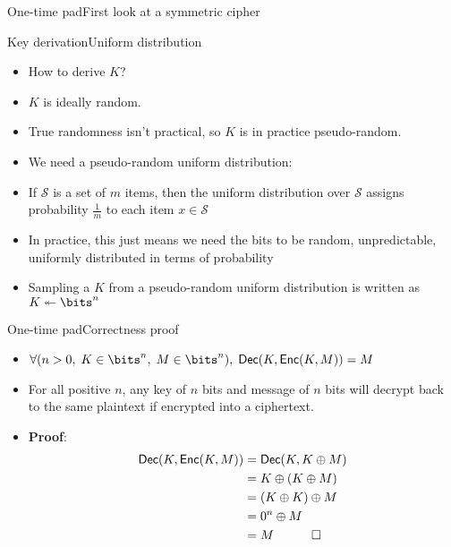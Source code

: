\documentclass[aspectratio=169, lualatex, handout]{beamer}
\begin{document}
\begin{frame}{One-time pad}{First look at a symmetric cipher}
\end{frame}

\begin{frame}{Key derivation}{Uniform distribution}
	\begin{itemize}[<+->]
		\item How to derive $K$?
		\item $K$ is ideally random.
		\item True randomness isn't practical, so $K$ is in practice pseudo-random.
		\item We need a pseudo-random uniform distribution:
		\item If $\mathcal{S}$ is a set of $m$ items, then the uniform distribution over $\mathcal{S}$ assigns probability $\frac{1}{m}$ to each item $x \in \mathcal{S}$
		\item In practice, this just means we need the bits to be random, unpredictable, uniformly distributed in terms of probability
		\item Sampling a $K$ from a pseudo-random uniform distribution is written as $K \twoheadleftarrow \bits^n$
	\end{itemize}
\end{frame}

\begin{frame}{One-time pad}{Correctness proof}
	\begin{itemize}[<+->]
		\item $\forall(n > 0,\; K \in \bits^{n},\; M \in \bits^{n}),\; \textsf{Dec}(K, \textsf{Enc}(K, M)) = M$
		\item For all positive $n$, any key of $n$ bits and message of $n$ bits will decrypt back to the same plaintext if encrypted into a ciphertext.
		\item \textbf{Proof}:
		      \begin{align*}
			      \textsf{Dec}(K, \textsf{Enc}(K, M)) & = \textsf{Dec}(K, K \oplus M) \\
			                                          & = K \oplus (K \oplus M)       \\
			                                          & = (K \oplus K) \oplus M       \\
			                                          & = 0^n \oplus M                \\
			                                          & = M \quad \qed
		      \end{align*}
	\end{itemize}
\end{frame}
\end{document}
